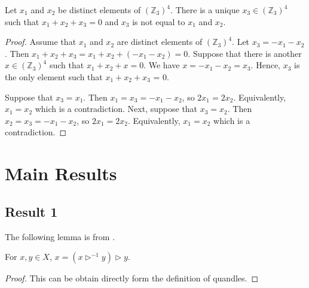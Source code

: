 \documentclass[ma493]{swumath}
\begin{document}
\begin{proposition} Let $x_1$ and $x_2$ be distinct elements of $(\mathbb{Z}_3)^4$. There is a unique $x_3 \in (\mathbb{Z}_3)^4$ such that $x_1+ x_2+ x_3 = 0$ and $x_3$ is not equal to $x_1$ and $x_2$.
\end{proposition}
\begin{proof} Assume that $x_1$ and $x_2$ are distinct elements of $(\mathbb{Z}_3)^4$. Let $x_3 = -x_1-x_2$. Then $x_1+ x_2+ x_3 = x_1+ x_2+ (-x_1-x_2) = 0.$ Suppose that there is another $x \in (\mathbb{Z}_3)^4$ such that $x_1+ x_2+ x = 0$. We have $x = -x_1-x_2 = x_3$. Hence, $x_3$ is the only element such that $x_1+ x_2+ x_3$ = 0.

Suppose that $x_3 = x_1$. Then $x_1 = x_3 = -x_1-x_2$, so $2x_1 = 2x_2$. Equivalently, $x_1 = x_2$ which is a contradiction. Next, suppose that $x_3 = x_2$. Then $x_2  = x_3 =-x_1-x_2$, so $2x_1= 2x_2$. Equivalently, $x_1 = x_2$ which is a contradiction. 
 \end{proof}

\chapter{Main Results}

\section{Result 1}
The following lemma is from \cite{davis}.
\begin{lemma}
	For $x, y \in X$, $x=(x \vartriangleright^{-1} y)\vartriangleright y$.
\end{lemma}
\begin{proof}
	This can be obtain directly form the definition of quandles.
\end{proof}
\end{document}
